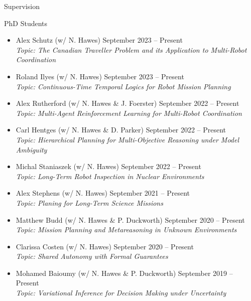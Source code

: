 
\begin{rSection}{Supervision}

\item PhD Students
\begin{itemize}

\item Alex Schutz  (w/ N. Hawes) \hfill September 2023 -- Present\\
\textit{Topic: The Canadian Traveller Problem and its Application to Multi-Robot Coordination}

\item Roland Ilyes  (w/ N. Hawes) \hfill September 2023 -- Present\\
\textit{Topic: Continuous-Time Temporal Logics for Robot Mission Planning}

\item Alex Rutherford  (w/ N. Hawes \&  J. Foerster) \hfill September 2022 -- Present\\
\textit{Topic: Multi-Agent Reinforcement Learning for Multi-Robot Coordination}

\item Carl Hentges  (w/ N. Hawes \& D. Parker) \hfill September 2022 -- Present\\
\textit{Topic: Hierarchical Planning for Multi-Objective Reasoning under Model Ambiguity}

\item Michal Staniaszek  (w/ N. Hawes) \hfill September 2022 -- Present\\
\textit{Topic: Long-Term Robot Inspection in Nuclear Environments}

\item Alex Stephens  (w/ N. Hawes) \hfill September 2021 -- Present\\
\textit{Topic: Planing for Long-Term Science Missions}

\item Matthew Budd  (w/ N. Hawes \& P. Duckworth) \hfill September 2020 -- Present\\
\textit{Topic: Mission Planning and Metareasoning in Unknown Environments}

\item Clarissa Costen  (w/ N. Hawes) \hfill September 2020 -- Present\\
\textit{Topic: Shared Autonomy with Formal Guarantees}

\item Mohamed Baioumy  (w/ N. Hawes \& P. Duckworth) \hfill September 2019 -- Present\\
\textit{Topic: Variational Inference for Decision Making under Uncertainty}


\end{itemize}
\end{rSection}
